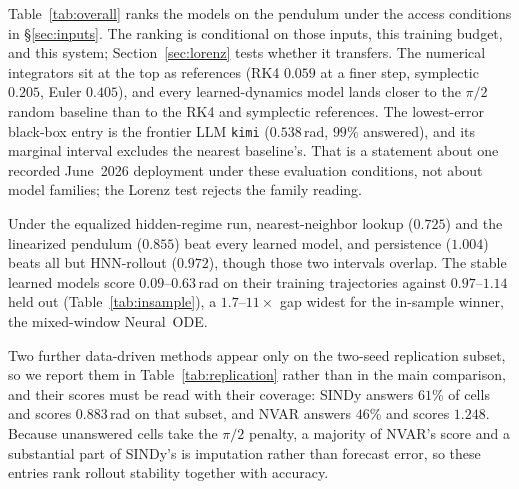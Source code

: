 \documentclass{article}
\begin{document}
Table~\ref{tab:overall} ranks the models on the pendulum under the access conditions in
\S\ref{sec:inputs}. The ranking is conditional on those inputs, this training budget, and this
system; Section~\ref{sec:lorenz} tests whether it transfers. The numerical integrators sit at the top as
references (RK4 $0.059$ at a finer step, symplectic $0.205$, Euler $0.405$),
and every learned-dynamics model lands closer to the $\pi/2$ random baseline than to the
RK4 and symplectic references. The lowest-error black-box entry is the frontier LLM \texttt{kimi}
($0.538$\,rad, $99\%$ answered), and its marginal interval excludes the nearest baseline's.
That is a statement about one recorded June~2026 deployment under these evaluation
conditions, not about model families; the Lorenz test rejects the family reading.

Under the equalized hidden-regime run, nearest-neighbor lookup ($0.725$) and the
linearized pendulum ($0.855$) beat every learned model, and persistence ($1.004$) beats all
but HNN-rollout ($0.972$), though those two intervals overlap. The stable learned models
score $0.09$--$0.63$\,rad on their training trajectories against $0.97$--$1.14$ held out
(Table~\ref{tab:insample}), a $1.7$--$11\times$ gap widest for the in-sample winner,
the mixed-window Neural~ODE.

Two further data-driven methods appear only on the two-seed replication subset, so we report them
in Table~\ref{tab:replication} rather than in the main comparison, and their scores must be read
with their coverage: SINDy answers $61\%$ of cells and scores $0.883$\,rad on that subset, and
NVAR answers $46\%$ and scores $1.248$. Because unanswered cells take the $\pi/2$ penalty, a
majority of NVAR's score and a substantial part of SINDy's is imputation rather than forecast
error, so these entries rank rollout stability together with accuracy.
\end{document}
